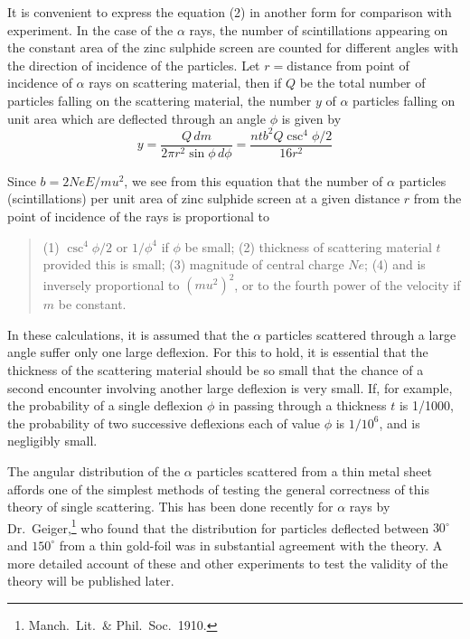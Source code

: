 \documentclass[12pt]{article}
\begin{document}
It is convenient to express the equation (2) in another form for comparison with experiment.
In the case of the $\alpha$ rays, the number of scintillations appearing on the constant area of the zinc
sulphide screen are counted for different angles with the direction of incidence of the particles.
Let $r=\text{distance}$ from point of incidence of $\alpha$ rays on scattering material,
then if $Q$ be the total number of particles falling on the scattering material,
the number $y$ of $\alpha$ particles falling on unit area which are deflected through an angle $\phi$ is given by
\begin{equation*}
y=\frac{Q\,dm}{2\pi r^2\sin\phi\,d\phi}
=\frac{ntb^2Q\csc^4\phi/2}{16r^2}
\tag{5}
\end{equation*}

Since $b=2NeE/mu^2$,
we see from this equation that the number of $\alpha$ particles (scintillations) per unit area of zinc sulphide
screen at a given distance $r$ from the point of incidence of the rays is proportional to

\begin{quote}
(1) $\csc^4\phi/2$ or $1/\phi^4$ if $\phi$ be small;\newline
(2) thickness of scattering material $t$ provided this is small;\newline
(3) magnitude of central charge $Ne$;\newline
(4) and is inversely proportional to $(mu^2)^2$, or to the fourth power
of the velocity if $m$ be constant.
\end{quote}

In these calculations, it is assumed that the $\alpha$ particles scattered through a large angle suffer
only one large deflexion.
For this to hold, it is essential that the thickness of the scattering material should be so small that
the chance of a second encounter involving another large deflexion is very small.
If, for example, the probability of a single deflexion $\phi$ in passing through a thickness $t$ is 1/1000,
the probability of two successive deflexions each of value $\phi$ is $1/10^6$, and is negligibly small.

\bigskip
The angular distribution of the $\alpha$ particles scattered from a thin metal sheet affords one of the
simplest methods of testing the general correctness of this theory of single scattering.
This has been done recently for $\alpha$ rays by Dr.~Geiger,\footnote{Manch.~Lit.~\& Phil.~Soc.~1910.}
who found that the distribution for particles deflected between $30^\circ$ and $150^\circ$
from a thin gold-foil was in substantial agreement with the theory.
A more detailed account of these and other experiments to test the validity of the theory will be published later.
\end{document}
